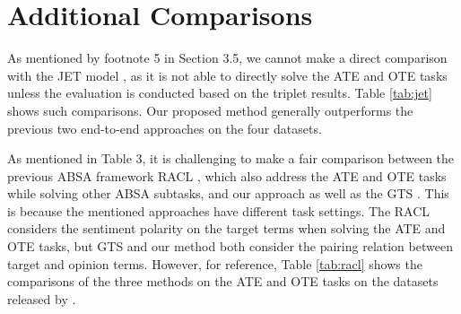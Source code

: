\documentclass[11pt,a4paper]{article}
\begin{document}
\section{Additional Comparisons}
As mentioned by footnote 5 in Section 3.5, we cannot make a direct comparison with the JET model \cite{Xu2020PositionAwareTF}, as it is not able to directly solve the ATE and OTE tasks unless the evaluation is conducted based on the triplet results. Table \ref{tab:jet} shows such comparisons. Our proposed method generally outperforms the previous two end-to-end approaches on the four datasets.

As mentioned in Table 3, it is challenging to make a fair comparison between the previous ABSA framework RACL \cite{chen-qian-2020-relation}, which also address the ATE and OTE tasks while solving other ABSA subtasks, and our approach as well as the GTS \cite{wu-etal-2020-grid}. This is because the mentioned approaches have different task settings. The RACL considers the sentiment polarity on the target terms when solving the ATE and OTE tasks, but GTS and our method both consider the pairing relation between target and opinion terms. However, for reference, Table \ref{tab:racl} shows the comparisons of the three methods on the ATE and OTE tasks on the datasets released by \citet{Xu2020PositionAwareTF}.
\end{document}
